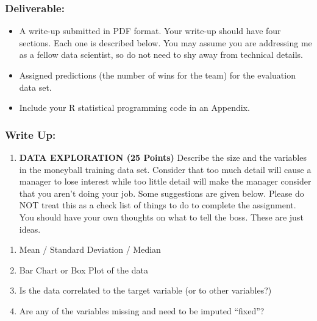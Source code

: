 \documentclass[
]{article}
\providecommand{\tightlist}{%
  \setlength{\itemsep}{0pt}\setlength{\parskip}{0pt}}
\begin{document}
\hypertarget{deliverable}{%
\subsubsection{\texorpdfstring{\textbf{Deliverable:}}{Deliverable:}}\label{deliverable}}

\begin{itemize}
\tightlist
\item
  A write-up submitted in PDF format. Your write-up should have four
  sections. Each one is described below. You may assume you are
  addressing me as a fellow data scientist, so do not need to shy away
  from technical details.
\item
  Assigned predictions (the number of wins for the team) for the
  evaluation data set.
\item
  Include your R statistical programming code in an Appendix.
\end{itemize}

\hypertarget{write-up}{%
\subsubsection{\texorpdfstring{\textbf{Write
Up:}}{Write Up:}}\label{write-up}}

\begin{enumerate}
\def\labelenumi{\arabic{enumi}.}
\tightlist
\item
  \textbf{DATA EXPLORATION (25 Points)} Describe the size and the
  variables in the moneyball training data set. Consider that too much
  detail will cause a manager to lose interest while too little detail
  will make the manager consider that you aren't doing your job. Some
  suggestions are given below. Please do NOT treat this as a check list
  of things to do to complete the assignment. You should have your own
  thoughts on what to tell the boss. These are just ideas.
\end{enumerate}

\begin{enumerate}
\def\labelenumi{\alph{enumi}.}
\tightlist
\item
  Mean / Standard Deviation / Median
\item
  Bar Chart or Box Plot of the data
\item
  Is the data correlated to the target variable (or to other variables?)
\item
  Are any of the variables missing and need to be imputed ``fixed''?
\end{enumerate}
\end{document}
